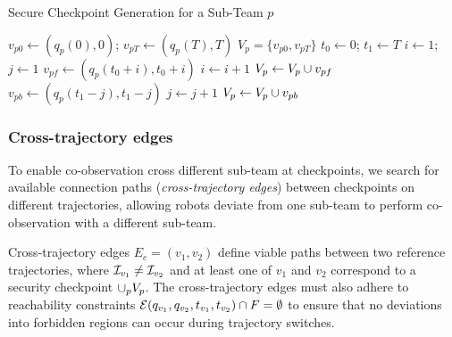 \documentclass[10pt,twocolumn,twoside]{IEEEtran}
\begin{document}
\begin{algorithm}
  \caption{Secure Checkpoint Generation for a Sub-Team $p$}\label{alg:checkpoint-gen}
  \begin{algorithmic}
  \State $v_{p0} \gets (q_{p}(0),0)$; $v_{pT} \gets (q_{p}(T),T)$
  \State $V_{p} = \{v_{p0}, v_{pT}\}$
  \State $t_0 \gets 0$; $t_1 \gets T$
    \State $i \gets 1$; $j\gets 1$
      \State $v_{pf} \gets (q_{p}(t_0+i),t_0+i)$
      \State $i \gets i+1$
    \EndWhile
    \State $V_{p}\gets V_{p}\cup v_{pf}$
    \State $v_{pb} \gets (q_{p}(t_1-j),t_1-j)$
    \State $j \gets j+1$
    \EndWhile
    \State $V_{p}\gets V_{p}\cup v_{pb}$
    \EndIf
  \EndWhile
  \end{algorithmic}
  \end{algorithm}


\subsubsection{Cross-trajectory edges}\label{sec:cross-traj-edges}
To enable co-observation cross different sub-team at checkpoints, we search for available connection paths (\emph{cross-trajectory edges}) between checkpoints on different trajectories, allowing robots deviate from one sub-team to perform co-observation with a different sub-team. 

Cross-trajectory edges $E_c = (v_1, v_2)$ define viable paths between two reference trajectories, where $\mathcal{I}_{v_1}\neq\mathcal{I}_{v_2}$ and at least one of $v_1 $ and $v_2$ correspond to a security checkpoint $\cup_p V_p$. The cross-trajectory edges must also adhere to reachability constraints $\mathcal{E}(q_{v_1}, q_{v_2}, t_{v_1},t_{v_2}) \cap F = \emptyset$ to ensure that no deviations into forbidden regions can occur during trajectory switches.  
\end{document}
